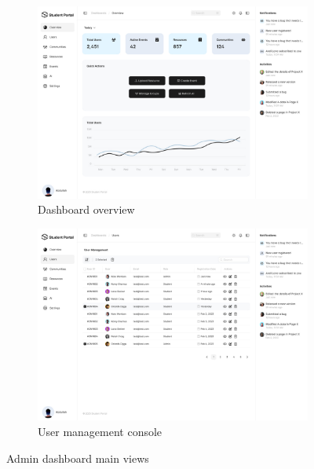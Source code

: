 \begin{figure}[H]
    \centering
    \begin{subfigure}{0.45\textwidth}
        \includegraphics[width=\textwidth]{latex-doc/images/web_interface/Overview.jpg}
        \caption{Dashboard overview}
        \label{fig:overview}
    \end{subfigure}
    \begin{subfigure}{0.45\textwidth}
        \includegraphics[width=\textwidth]{latex-doc/images/web_interface/User-Management.jpg}
        \caption{User management console}
        \label{fig:user_mgmt}
    \end{subfigure}
    \caption{Admin dashboard main views}
    \label{fig:admin_main}
\end{figure}


